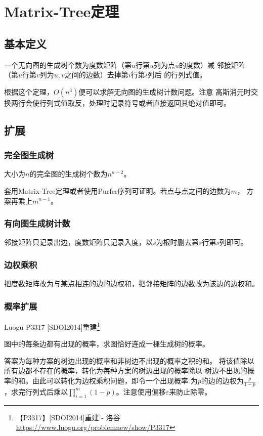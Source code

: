 \section{Matrix-Tree定理}
\subsection{基本定义}
\begin{theorem}
	一个无向图的生成树个数为度数矩阵（第$u$行第$u$列为点$u$的度数）减
	邻接矩阵（第$u$行第$v$列为$u,v$之间的边数）去掉第$i$行第$i$列后
	的行列式值。
\end{theorem}
根据这个定理，$O(n^3)$便可以求解无向图的生成树计数问题。注意
高斯消元时交换两行会使行列式值取反，处理时记录符号或者直接返回其绝对值即可。
\subsection{扩展}
\subsubsection{完全图生成树}
\begin{theorem}
	大小为$n$的完全图的生成树个数为$n^{n-2}$。
\end{theorem}
套用Matrix-Tree定理或者使用Purfer序列可证明。若点与点之间的边数为$m$，
方案再乘上$m^{n-1}$。
\subsubsection{有向图生成树计数}
邻接矩阵只记录出边，度数矩阵只记录入度，以$s$为根时删去第$s$行第$s$列即可。
\subsubsection{边权乘积}
把度数矩阵改为与某点相连的边的边权和，把邻接矩阵的边数改为该边的边权和。
\subsubsection{概率扩展}
Luogu P3317 [SDOI2014]重建\footnote{【P3317】[SDOI2014]重建 - 洛谷
\url{https://www.luogu.org/problemnew/show/P3317}
}

图中的每条边都有出现的概率，求图恰好连成一棵生成树的概率。

答案为每种方案的树边出现的概率和非树边不出现的概率之积的和。
将该值除以所有边都不存在的概率，转化为每种方案的树边出现的概率除以
树边不出现的概率的和。由此可以转化为边权乘积问题，即令一个出现概率
为$p$的边的边权为$\frac{p}{1-p}$，求完行列式后乘以$\displaystyle
	\prod_{i=1}^m{(1-p)}$。注意使用偏移$\varepsilon$来防止除零。


